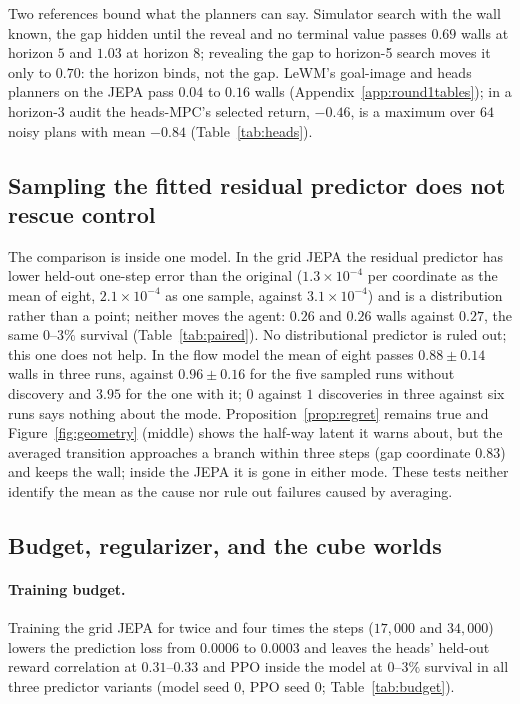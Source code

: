 Two references bound what the planners can say. Simulator search with the wall known, the gap hidden
until the reveal and no terminal value passes $0.69$ walls at horizon $5$ and $1.03$ at horizon $8$;
revealing the gap to horizon-5 search moves it only to $0.70$: the horizon binds, not the gap.
LeWM's goal-image and heads planners on the JEPA pass $0.04$ to $0.16$ walls
(Appendix~\ref{app:round1tables}); in a horizon-$3$ audit the heads-MPC's selected return, $-0.46$, is a maximum over $64$ noisy plans with mean $-0.84$ (Table~\ref{tab:heads}).

\subsection{Sampling the fitted residual predictor does not rescue control}
\label{sec:results-mean}

The comparison is inside one model. In the grid JEPA the residual predictor has lower held-out one-step error than the original ($1.3\times10^{-4}$ per coordinate as the mean of eight, $2.1\times10^{-4}$ as one sample, against $3.1\times10^{-4}$) and is a distribution rather than a point; neither moves the agent: $0.26$ and $0.26$ walls against $0.27$, the same $0$--$3\%$ survival (Table~\ref{tab:paired}).
No distributional predictor is ruled out; this one does not help. In the flow model the mean of eight passes $0.88\pm0.14$ walls in three runs, against $0.96\pm0.16$ for the five sampled runs without discovery and $3.95$ for the one with it; $0$ against $1$ discoveries in three against six runs says nothing
about the mode. Proposition~\ref{prop:regret} remains true and Figure~\ref{fig:geometry} (middle) shows the half-way latent it warns about, but the averaged transition approaches a branch within three steps (gap coordinate $0.83$) and keeps the wall; inside the JEPA it is gone in either mode. These tests neither identify the mean as the cause nor rule out failures caused by averaging.

\subsection{Budget, regularizer, and the cube worlds}
\label{sec:results-rest}

\paragraph{Training budget.} Training the grid JEPA for twice and four times the steps ($17{,}000$
and $34{,}000$) lowers the prediction loss from $0.0006$ to $0.0003$ and leaves the heads' held-out reward correlation at $0.31$--$0.33$ and PPO inside the model at $0$--$3\%$ survival in all three predictor variants (model seed $0$, PPO seed $0$; Table~\ref{tab:budget}).

